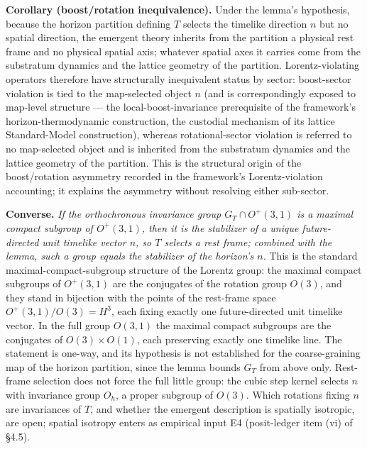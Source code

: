 \documentclass[
]{article}
\begin{document}
\textbf{Corollary (boost/rotation inequivalence).} Under the lemma's
hypothesis, because the horizon partition defining \(T\) selects the
timelike direction \(n\) but no spatial direction, the emergent theory
inherits from the partition a physical rest frame and no physical
spatial axis; whatever spatial axes it carries come from the substratum
dynamics and the lattice geometry of the partition. Lorentz-violating
operators therefore have structurally inequivalent status by sector:
boost-sector violation is tied to the map-selected object \(n\) (and is
correspondingly exposed to map-level structure --- the
local-boost-invariance prerequisite of the framework's
horizon-thermodynamic construction, the custodial mechanism of its
lattice Standard-Model construction), whereas rotational-sector
violation is referred to no map-selected object and is inherited from
the substratum dynamics and the lattice geometry of the partition. This
is the structural origin of the boost/rotation asymmetry recorded in the
framework's Lorentz-violation accounting; it explains the asymmetry
without resolving either sub-sector.

\textbf{Converse.} \emph{If the orthochronous invariance group
\(G_T \cap O^{+}(3,1)\) is a maximal compact subgroup of \(O^{+}(3,1)\),
then it is the stabilizer of a unique future-directed unit timelike
vector \(n\), so \(T\) selects a rest frame; combined with the lemma,
such a group equals the stabilizer of the horizon's \(n\).} This is the
standard maximal-compact-subgroup structure of the Lorentz group: the
maximal compact subgroups of \(O^{+}(3,1)\) are the conjugates of the
rotation group \(O(3)\), and they stand in bijection with the points of
the rest-frame space \(O^{+}(3,1)/O(3) = H^3\), each fixing exactly one
future-directed unit timelike vector. In the full group \(O(3,1)\) the
maximal compact subgroups are the conjugates of \(O(3)\times O(1)\),
each preserving exactly one timelike line. The statement is one-way, and
its hypothesis is not established for the coarse-graining map of the
horizon partition, since the lemma bounds \(G_T\) from above only.
Rest-frame selection does not force the full little group: the cubic
step kernel selects \(n\) with invariance group \(O_h\), a proper
subgroup of \(O(3)\). Which rotations fixing \(n\) are invariances of
\(T\), and whether the emergent description is spatially isotropic, are
open; spatial isotropy enters as empirical input E4 (posit-ledger item
(vi) of §4.5).
\end{document}
